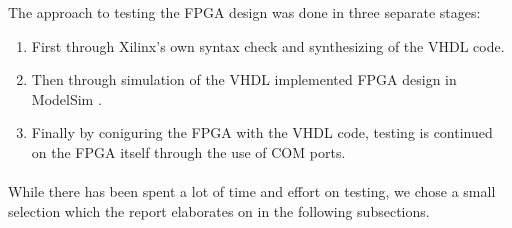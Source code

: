 The approach to testing the FPGA design was done in three separate stages:
\begin{enumerate}
	\item First through Xilinx's \cite{xilinx-ise} own syntax check and
synthesizing of the VHDL code.
	\item Then through simulation of the VHDL implemented FPGA design in
ModelSim \cite{modelsim}.
	\item Finally by coniguring the FPGA with the VHDL code, testing is
continued on the FPGA itself through the use of COM ports.
\end{enumerate}
\paragraph*{}
While there has been spent a lot of time and effort on testing, we chose a small
selection which the report elaborates on in the following subsections.
